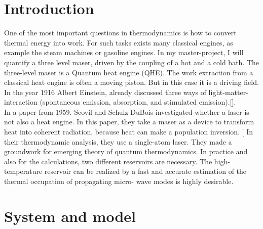 \documentclass[12pt,a4paper]{article}
\begin{document}
\section{Introduction}
One of the most important questions in thermodynamics is how to convert
thermal energy into work. For such tasks exists many classical engines, as
example the steam machines or gasoline engines. %
In my master-project, I will quantify a three level maser, driven by the coupling of a hot and a cold bath.
The three-level maser is a Quantum heat engine (QHE). The work extraction from a classical heat engine is often a moving piston. But in this case
it is a driving field. In the year 1916 Albert Einstein, already discussed three ways of
light-matter-interaction (spontaneous emission, absorption, and stimulated
emission).[\cite{Li2017}]. \\In a paper from 1959.  Scovil and Schulz-DuBois investigated whether a laser is not
also a heat engine. In this paper, they take a maser as a device to transform heat into coherent radiation, because heat can make a population inversion. [\cite{Scovil1959}
In their thermodynamic analysis, they use a single-atom laser. They made a
groundwork for emerging theory of quantum thermodynamics. In practice and also for the calculations, two different reservoirs are necessary. The high-temperature reservoir can be
realized by a fast and accurate
estimation of the thermal occupation of propagating micro-
wave modes is highly desirable. \cite{Scigliuzzo2020}

\newpage
\section{System and model}
\end{document}
